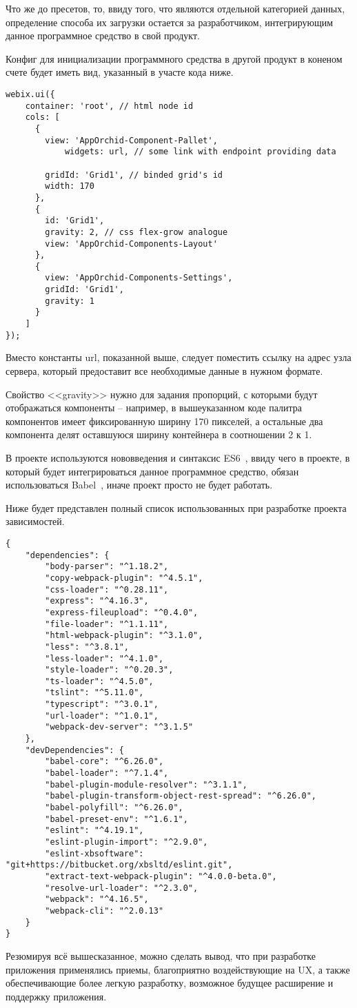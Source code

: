 Что же до пресетов, то, ввиду того, что являются отдельной категорией данных, определение способа их загрузки остается за разработчиком, интегрирующим данное программное средство в свой продукт.

Конфиг для инициализации программного средства в другой продукт в коненом счете будет иметь вид, указанный в участе кода ниже.

\begin{lstlisting}
webix.ui({
	container: 'root', // html node id
	cols: [
	  {
	    view: 'AppOrchid-Component-Pallet',
			widgets: url, // some link with endpoint providing data
			
	    gridId: 'Grid1', // binded grid's id
	    width: 170
	  },
	  {
	    id: 'Grid1',
	    gravity: 2, // css flex-grow analogue
	    view: 'AppOrchid-Components-Layout'
	  },
	  {
	    view: 'AppOrchid-Components-Settings',
	    gridId: 'Grid1',
	    gravity: 1
	  }
	]
});
\end{lstlisting}

Вместо константы url, показанной выше, следует поместить ссылку на адрес узла сервера, который предоставит все необходимые данные в нужном формате.

Свойство <<gravity>> нужно для задания пропорций, с которыми будут отображаться компоненты -- например, в вышеуказанном коде палитра компонентов имеет фиксированную ширину 170 пикселей, а остальные два компонента делят оставшуюся ширину контейнера в соотношении 2 к 1.

В проекте используются нововведения и синтаксис ES6~\cite{ecma_additional}, ввиду чего в проекте, в который будет интегрироваться данное программное средство, обязан использоваться Babel~\cite{babel}, иначе проект просто не будет работать. 

Ниже будет представлен полный список использованных при разработке проекта зависимостей. 

\begin{lstlisting}
{
	"dependencies": {
		"body-parser": "^1.18.2",
		"copy-webpack-plugin": "^4.5.1",
		"css-loader": "^0.28.11",
		"express": "^4.16.3",
		"express-fileupload": "^0.4.0",
		"file-loader": "^1.1.11",
		"html-webpack-plugin": "^3.1.0",
		"less": "^3.8.1",
		"less-loader": "^4.1.0",
		"style-loader": "^0.20.3",
		"ts-loader": "^4.5.0",
		"tslint": "^5.11.0",
		"typescript": "^3.0.1",
		"url-loader": "^1.0.1",
		"webpack-dev-server": "^3.1.5"
	},
	"devDependencies": {
		"babel-core": "^6.26.0",
		"babel-loader": "^7.1.4",
		"babel-plugin-module-resolver": "^3.1.1",
		"babel-plugin-transform-object-rest-spread": "^6.26.0",
		"babel-polyfill": "^6.26.0",
		"babel-preset-env": "^1.6.1",
		"eslint": "^4.19.1",
		"eslint-plugin-import": "^2.9.0",
		"eslint-xbsoftware": "git+https://bitbucket.org/xbsltd/eslint.git",
		"extract-text-webpack-plugin": "^4.0.0-beta.0",
		"resolve-url-loader": "^2.3.0",
		"webpack": "^4.16.5",
		"webpack-cli": "^2.0.13"
	}
}
\end{lstlisting}

Резюмируя всё вышесказанное, можно сделать вывод, что при разработке приложения применялись приемы, благоприятно воздействующие на UX, а также обеспечивающие более легкую разработку, возможное будущее расширение и поддержку приложения.